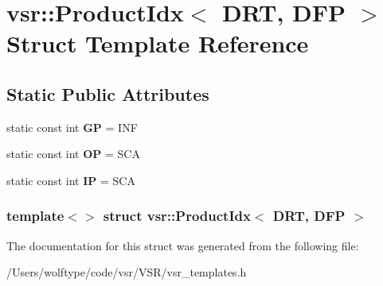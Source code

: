 \hypertarget{structvsr_1_1_product_idx_3_01_d_r_t_00_01_d_f_p_01_4}{\section{vsr\-:\-:Product\-Idx$<$ D\-R\-T, D\-F\-P $>$ Struct Template Reference}
\label{structvsr_1_1_product_idx_3_01_d_r_t_00_01_d_f_p_01_4}
}
\subsection*{Static Public Attributes}
\begin{DoxyCompactItemize}
\item 
\hypertarget{structvsr_1_1_product_idx_3_01_d_r_t_00_01_d_f_p_01_4_a36a90b8d7a86f9e0f058c27d6ce33e84}{static const int {\bfseries G\-P} = I\-N\-F}\label{structvsr_1_1_product_idx_3_01_d_r_t_00_01_d_f_p_01_4_a36a90b8d7a86f9e0f058c27d6ce33e84}

\item 
\hypertarget{structvsr_1_1_product_idx_3_01_d_r_t_00_01_d_f_p_01_4_a57d111b4216f7f29da4c0be1b43a1da7}{static const int {\bfseries O\-P} = S\-C\-A}\label{structvsr_1_1_product_idx_3_01_d_r_t_00_01_d_f_p_01_4_a57d111b4216f7f29da4c0be1b43a1da7}

\item 
\hypertarget{structvsr_1_1_product_idx_3_01_d_r_t_00_01_d_f_p_01_4_af919690e393b65ccd4d43c1896a79e1b}{static const int {\bfseries I\-P} = S\-C\-A}\label{structvsr_1_1_product_idx_3_01_d_r_t_00_01_d_f_p_01_4_af919690e393b65ccd4d43c1896a79e1b}

\end{DoxyCompactItemize}
\subsubsection*{template$<$$>$ struct vsr\-::\-Product\-Idx$<$ D\-R\-T, D\-F\-P $>$}



The documentation for this struct was generated from the following file\-:\begin{DoxyCompactItemize}
\item 
/\-Users/wolftype/code/vsr/\-V\-S\-R/vsr\-\_\-templates.\-h\end{DoxyCompactItemize}
